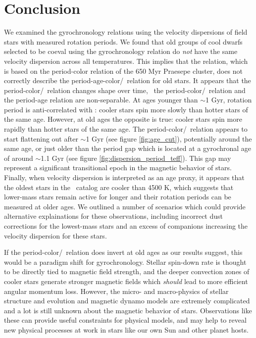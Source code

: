 \section{Conclusion}

We examined the gyrochronology relations using the velocity dispersions of
field stars with measured rotation periods.
We found that old groups of cool dwarfs selected to be coeval using the
\citet{angus2019} gyrochronology relation do {\it not} have the same velocity
dispersion across all temperatures.
This implies that the \citet{angus2019} relation, which is based on the
period-color relation of the 650 Myr Praesepe cluster, does not correctly
describe the period-age-color/\teff\ relation for old stars.
It appears that the period-color/\teff\ relation changes shape over time, \ie\
the period-color/\teff\ relation and the period-age relation are
non-separable.
At ages younger than $\sim$1 Gyr, rotation period is anti-correlated with
\teff: cooler stars spin more slowly than hotter stars of the same age.
However, at old ages the opposite is true: cooler stars spin more rapidly than
hotter stars of the same age.
The period-color/\teff\ relation appears to start flattening out after $\sim$1
Gyr (see figure \ref{fig:age_cut}), potentially around the same age, or just
older than the period gap which is located at a gyrochronal age of around
$\sim$1.1 Gyr (see figure \ref{fig:dispersion_period_teff}).
This gap may represent a significant transitional epoch in the magnetic
behavior of stars.
Finally, when velocity dispersion is interpreted as an age proxy, it appears
that the oldest stars in the \mct\ catalog are cooler than 4500 K, which
suggests that lower-mass stars remain active for longer and their rotation
periods can be measured at older ages.
We outlined a number of scenarios which could provide alternative
explainations for these observations, including incorrect dust corrections for
the lowest-mass stars and an excess of companions increasing the velocity
dispersion for these stars.

If the period-color/\teff\ relation does invert at old ages as our results
suggest, this would be a paradigm shift for gyrochronology.
Stellar spin-down rate is thought to be directly tied to magnetic field
strength, and the deeper convection zones of cooler stars generate stronger
magnetic fields which {\it should} lead to more efficient angular momentum
loss.
However, the micro- and macro-physics of stellar structure and evolution and
magnetic dynamo models are extremely complicated and a lot is still unknown
about the magnetic behavior of stars.
Observations like these can provide useful constraints for physical models,
and may help to reveal new physical processes at work in stars like our own
Sun and other planet hosts.
